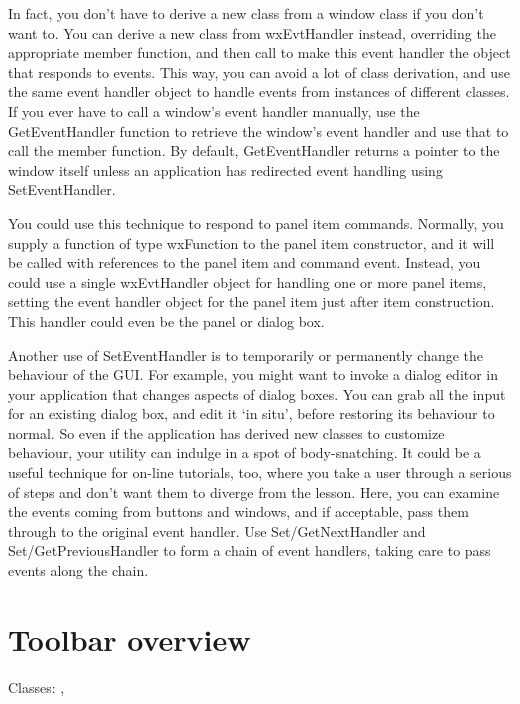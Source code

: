 In fact, you don't have to derive a new class from a window class
if you don't want to. You can derive a new class from wxEvtHandler instead,
overriding the appropriate member function, and then call
\rtfsp{} to make this
event handler the object that responds to events. This way, you can avoid
a lot of class derivation, and use the same event handler object to
handle events from instances of different classes. If you ever have to call a window's event handler
manually, use the GetEventHandler function to retrieve the window's event handler and use that
to call the member function. By default, GetEventHandler returns a pointer to the window itself
unless an application has redirected event handling using SetEventHandler.

You could use this technique to respond to panel item commands. Normally,
you supply a function of type wxFunction to the panel item constructor, and
it will be called with references to the panel item and command event.
Instead, you could use a single wxEvtHandler object for handling one or
more panel items, setting the event handler object for the panel item just
after item construction. This handler could even be the panel or dialog box.

Another use of SetEventHandler is to temporarily or permanently change the
behaviour of the GUI. For example, you might want to invoke a dialog editor
in your application that changes aspects of dialog boxes. You can
grab all the input for an existing dialog box, and edit it `in situ',
before restoring its behaviour to normal. So even if the application
has derived new classes to customize behaviour, your utility can indulge
in a spot of body-snatching. It could be a useful technique for on-line
tutorials, too, where you take a user through a serious of steps and
don't want them to diverge from the lesson. Here, you can examine the events
coming from buttons and windows, and if acceptable, pass them through to
the original event handler. Use Set/GetNextHandler and Set/GetPreviousHandler
to form a chain of event handlers, taking care to pass events along the chain.

\section{Toolbar overview}\label{wxtoolbaroverview}

Classes: , 

